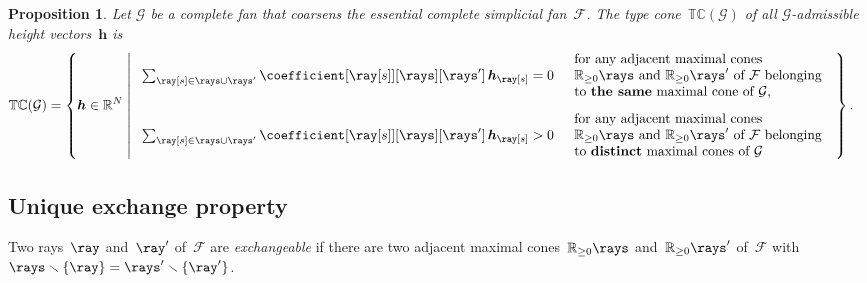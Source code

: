 \documentclass{amsart}
\newtheorem{proposition}[theorem]{Proposition}
\theoremstyle{definition}
\newcommand{\R}{\mathbb{R}} %
\renewcommand{\c}[1]{{\mathcal{#1}}} %
\renewcommand{\b}[1]{{\boldsymbol{#1}}} %
\newcommand{\set}[2]{\left\{ #1 \;\middle|\; #2 \right\}} %
\newcommand{\ssm}{\smallsetminus} %
\newcommand{\eqdef}{\mbox{\,\raisebox{0.2ex}{\scriptsize\ensuremath{\mathrm:}}\ensuremath{=}\,}} %
\newcommand{\darkblue}{\color{darkblue}} %
\newcommand{\defn}[1]{\textsl{\darkblue #1}} %
\newcommand{\Fan}{\mathcal{F}} %
\newcommand{\typeCone}{\mathbb{TC}} %
\newcommand{\compatibilityDegree}[2]{(#1\,\|\,#2)} %
\begin{document}
\begin{proposition}
\label{prop:non-simplicial}
Let $\c{G}$ be a complete fan that coarsens the essential complete simplicial fan~$\Fan$.
The \defn{type cone}~$\typeCone(\c{G})$ of all $\c{G}$-admissible height vectors~$\b{h}$ is
\begin{align*}
\typeCone(\c{G}) 
& = \left\{\b{h} \in \R^N\;\middle|\;
\begin{array}{ll}
\sum_{\ray[s] \in \rays \cup \rays'} \coefficient[{\ray[s]}][\rays][\rays'] \, \b{h}_{\ray[s]} = 0
& \begin{array}{l} \text{for any adjacent maximal cones} \\ \text{$\R_{\ge0}\rays$ and~$\R_{\ge0}\rays'$ of~$\Fan$ belonging}\\\text{to \textbf{the same} maximal cone of $\c{G}$,}\end{array}
\\[.7cm]
\sum_{\ray[s] \in \rays \cup \rays'} \coefficient[{\ray[s]}][\rays][\rays'] \, \b{h}_{\ray[s]} > 0
& \begin{array}{l} \text{for any adjacent maximal cones} \\ \text{$\R_{\ge0}\rays$ and~$\R_{\ge0}\rays'$ of~$\Fan$ belonging}\\\text{to \textbf{distinct} maximal cones of $\c{G}$}\end{array}
\end{array}
\right\}.
\end{align*}
\end{proposition}


\subsection{Unique exchange property}
\label{subsec:uniqueExchangeProperty}

Two rays~$\ray$ and~$\ray'$ of~$\Fan$ are
\defn{exchangeable} if there are two adjacent maximal cones~$\R_{\ge0}\rays$ and~$\R_{\ge0}\rays'$ of~$\Fan$ with ${\rays \ssm \{\ray\} = \rays' \ssm \{\ray'\}}$.
\end{document}
